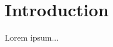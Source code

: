 \documentclass[../main.tex]{subfiles}
\begin{document}
\section{Introduction}

Lorem ipsum...
\end{document}
